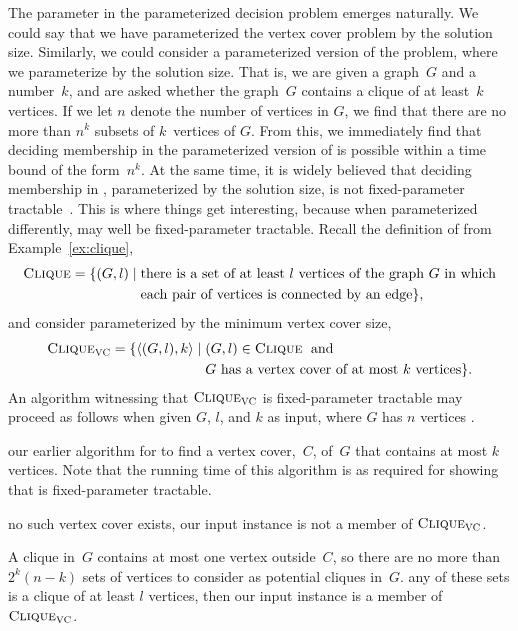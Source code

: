 The parameter in the parameterized decision problem  emerges naturally.
We could say that we have parameterized the vertex cover problem by the solution size.
Similarly, we could consider a parameterized version of the  problem, where we parameterize by the solution size.
That is, we are given a graph~$G$ and a number~$k$, and are asked whether the graph~$G$ contains a clique of at least~$k$ vertices.
If we let $n$ denote the number of vertices in $G$, we find that there are no more than $n^k$ subsets of $k$~vertices of $G$.
From this, we immediately find that deciding membership in the parameterized version of  is possible within a time bound of the form~$n^k$.
At the same time, it is widely believed that deciding membership in , parameterized by the solution size, is not fixed-parameter tractable~\parencite{downey1999parameterized,cygan2015parameterized}.
This is where things get interesting, because when parameterized differently,  may well be fixed-parameter tractable.
Recall the definition of  from Example~\ref{ex:clique},
\begin{align*}
  \textnormal{\textsc{Clique}} = \{(G, l) \;|\; &\text{there is a set of at least $l$ vertices of the graph $G$ in which} \\
  	&\text{each pair of vertices is connected by an edge}\},
\end{align*}
and consider  parameterized by the minimum vertex cover size,
\begin{align*}
  \textnormal{\textsc{Clique}}_{\textnormal{\textsc{VC}}} = \{{\langle (G, l), k\rangle} \;|\; &(G, l) \in \textnormal{\textsc{Clique}} \;\text{ and }\; \\
  	&\text{$G$ has a vertex cover of at most $k$ vertices}\}.
\end{align*}
An algorithm witnessing that $\textnormal{\textsc{Clique}}_{\textnormal{\textsc{VC}}}$ is fixed-parameter tractable may proceed as follows when given $G$, $l$, and $k$ as input, where $G$ has $n$ vertices \parencite[Section~15.2.4]{cygan2015parameterized}.
\begin{codelisting}
\item
   our earlier algorithm for  to find a vertex cover,~$C$, of~$G$ that contains at most $k$ vertices.
  Note that the running time of this algorithm is as required for showing that  is fixed-parameter tractable.
\item
   no such vertex cover exists, our input instance is not a member of $\pr{Clique}_\pr{VC}$.
\item
  A clique in~$G$ contains at most one vertex outside~$C$, so there are no more than $2^k (n - k)$ sets of vertices to consider as potential cliques in~$G$.
   any of these sets is a clique of at least $l$ vertices, then our input instance is a member of $\pr{Clique}_\pr{VC}$.
\end{codelisting}

